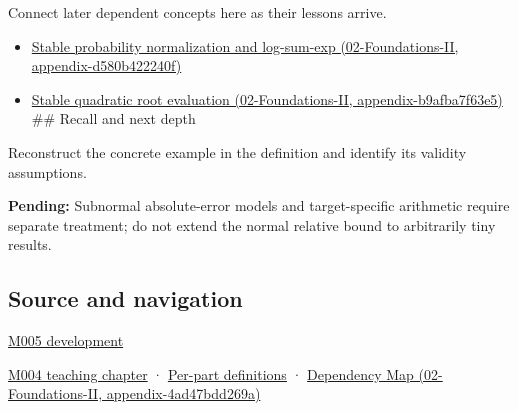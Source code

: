 Connect later dependent concepts here as their lessons arrive.

\begin{itemize}
\tightlist
\item
  \href{}{Stable probability normalization and log-sum-exp (02-Foundations-II, appendix-d580b422240f)}
\item
  \href{}{Stable quadratic root evaluation (02-Foundations-II, appendix-b9afba7f63e5)} \#\# Recall and next depth
\end{itemize}

Reconstruct the concrete example in the definition and identify its validity assumptions.

\textbf{Pending:} Subnormal absolute-error models and target-specific arithmetic require separate treatment; do not extend the normal relative bound to arbitrarily tiny results.

\subsection{Source and navigation}\label{source-and-navigation}

\href{Continuous\%20Notes/Computing\%20Foundations\%20-\%20From\%20Bits\%20to\%20C++\%20and\%20Systems\%20APIs\#When\%20arithmetic\%20meets\%20uncertainty}{M005 development}

\href{Continuous\%20Notes/Computing\%20Foundations\%20-\%20From\%20Bits\%20to\%20C++\%20and\%20Systems\%20APIs\#A\%20stretching\%20ruler\%20for\%20real-valued\%20quantities}{M004 teaching chapter} · \hyperref[appendix-fd090d982a15]{Per-part definitions} · \href{}{Dependency Map (02-Foundations-II, appendix-4ad47bdd269a)}
